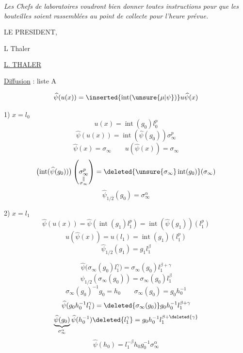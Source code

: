 \textit{Les Chefs de laboratoires voudront bien donner toutes instructions pour que les bouteilles soient rassemblées au point de collecte pour l'heure prévue.}

\begin{flushright}
LE PRESIDENT,

L Thaler

\uline{L. THALER}
\end{flushright}

\uline{Diffusion} : liste A



\[
\widehat{\psi}(u(x))
=\inserted{\operatorname{int}(\unsure{\mu|\psi})}u\widehat{\psi}(x)
\]

1) \quad $x=l_0$
\[
u(x)=\operatorname{int}(g_0)l_0^p
\]
\[
\widehat{\psi}(u(x))=\operatorname{int}(\widehat{\psi}(g_0))\sigma_\infty^p
\]
\[
\widehat{\psi}(x)=\sigma_\infty
\qquad u(\widehat{\psi}(x))=\sigma_\infty
\]
\[
\bigl(\operatorname{int}(\widehat{\psi}(g_0))\bigr)
\left(\underset{\substack{\Vert\\\sigma_\infty}}{\sigma_\infty^p}\right)
=\deleted{\unsure{\sigma_\infty}\operatorname{int}(g_0)}(\sigma_\infty)
\]
\[
\boxed{\widehat{\psi}_{1/2}(g_0)=\sigma_\infty^\alpha}
\]

2) \quad $x=l_1$
\[
\widehat{\psi}(u(x))
=\widehat{\psi}(\operatorname{int}(g_1)l_1^p)
=\operatorname{int}(\widehat{\psi}(g_1))(l_1^p)
\]
\[
u(\widehat{\psi}(x))=u(l_1)=\operatorname{int}(g_1)(l_1^p)
\]
\[
\boxed{\widehat{\psi}_{1/2}(g_1)=g_1l_1^\beta}
\]

\margin{\[
g_1=g\rho(g_0)=\sigma_\infty(g_0l_0^\gamma)
=\sigma_\infty(g_0)l_1^\gamma
\]}

\[
\widehat{\psi}\bigl(\sigma_\infty(g_0)l_1^\gamma\bigr)
=\sigma_\infty(g_0)l_1^{\beta+\gamma}
\]
\[
\boxed{\widehat{\psi}_{1/2}(\sigma_\infty(g_0))
=\sigma_\infty(g_0)l_1^\beta}
\]
\[
\sigma_\infty(g_0)^{-1}g_0=h_0
\qquad
\sigma_\infty(g_0)=g_0h_0^{-1}
\]
\[
\widehat{\psi}(g_0h_0^{-1}l_1^\gamma)
=\deleted{\sigma_\infty(g_0)}g_0h_0^{-1}l_1^{\beta+\gamma}
\]
\[
\underbrace{\widehat{\psi}(g_0)}_{\sigma_\infty^\alpha}
\widehat{\psi}(h_0^{-1})\deleted{l_1^\gamma}
=g_0h_0^{-1}l_1^{\beta+\deleted{\gamma}}
\]
\[
\widehat{\psi}(h_0)=l_1^{-\beta}h_0g_0^{-1}\sigma_\infty^\alpha
\]

